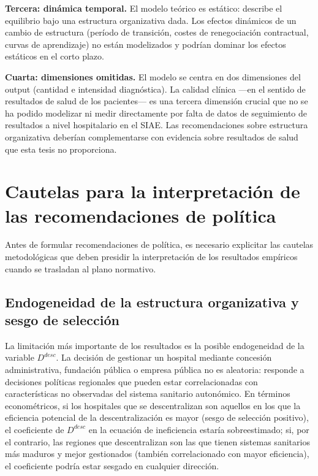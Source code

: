 \documentclass[12pt, a4paper, twoside, openright]{book}
\theoremstyle{plain}
\theoremstyle{definition}
\theoremstyle{remark}
\begin{document}
\textbf{Tercera: dinámica temporal.} El modelo teórico es estático: describe el equilibrio bajo una estructura organizativa dada. Los efectos dinámicos de un cambio de estructura (período de transición, costes de renegociación contractual, curvas de aprendizaje) no están modelizados y podrían dominar los efectos estáticos en el corto plazo.

\textbf{Cuarta: dimensiones omitidas.} El modelo se centra en dos dimensiones del output (cantidad e intensidad diagnóstica). La calidad clínica ---en el sentido de resultados de salud de los pacientes--- es una tercera dimensión crucial que no se ha podido modelizar ni medir directamente por falta de datos de seguimiento de resultados a nivel hospitalario en el SIAE. Las recomendaciones sobre estructura organizativa deberían complementarse con evidencia sobre resultados de salud que esta tesis no proporciona.

\section{Cautelas para la interpretación de las recomendaciones de política}
\label{sec:cautelas_politica}

Antes de formular recomendaciones de política, es necesario explicitar las cautelas metodológicas que deben presidir la interpretación de los resultados empíricos cuando se trasladan al plano normativo.

\subsection{Endogeneidad de la estructura organizativa y sesgo de selección}

La limitación más importante de los resultados es la posible endogeneidad de la variable $D^{desc}$. La decisión de gestionar un hospital mediante concesión administrativa, fundación pública o empresa pública no es aleatoria: responde a decisiones políticas regionales que pueden estar correlacionadas con características no observadas del sistema sanitario autonómico. En términos econométricos, si los hospitales que se descentralizan son aquellos en los que la eficiencia potencial de la descentralización es mayor (sesgo de selección positivo), el coeficiente de $D^{desc}$ en la ecuación de ineficiencia estaría sobreestimado; si, por el contrario, las regiones que descentralizan son las que tienen sistemas sanitarios más maduros y mejor gestionados (también correlacionado con mayor eficiencia), el coeficiente podría estar sesgado en cualquier dirección.
\end{document}
